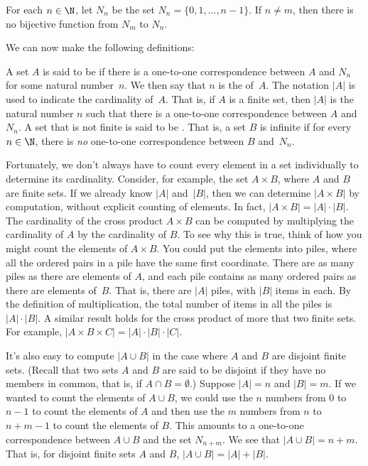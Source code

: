 \begin{theorem}
For each $n\in\N$, let $N_n$ be the set $N_n=\{0,1,\dots,n-1\}$.
If $n\not=m$, then there is no bijective function from $N_m$ to $N_n$.
\end{theorem}


We can now make the following definitions:

\begin{definition}
A set $A$ is said to be  if there is a one-to-one
correspondence between $A$ and $N_n$ for some natural number~$n$.  We then
say that $n$ is the  of~$A$.  The notation $|A|$ is
used to indicate the cardinality of~$A$.  That is, if $A$ is a finite set,
then $|A|$ is the natural number $n$ such that there is a one-to-one
correspondence between $A$ and $N_n$.  A set that is not finite is
said to be .  That is, a set $B$ is infinite
if for every $n\in \N$, there is \emph{no} one-to-one correspondence between
$B$ and~$N_n$.
\end{definition}

Fortunately, we don't always have to count every element in a set individually
to determine its cardinality.  Consider, for example, the set $A\times B$,
where $A$ and $B$ are finite sets.  If we already know $|A|$ and~$|B|$,
then we can determine $|A\times B|$ by computation, without explicit counting of elements.
In fact, $|A\times B|=|A|\cdot |B|$.  The cardinality of the cross product
$A\times B$ can be computed by multiplying the cardinality of $A$ by
the cardinality of $B$.  To see why this is true, think of how you might
count the elements of $A\times B$.  You could put the elements into piles,
where all the ordered pairs in a pile have the same first coordinate.  There
are as many piles as there are elements of $A$, and each pile contains
as many ordered pairs as there are elements of~$B$.  That is, there
are $|A|$ piles, with $|B|$ items in each.  By the definition of multiplication,
the total number of items in all the piles is $|A|\cdot|B|$.
A similar result holds for the cross product of more that two finite sets.
For example, $|A\times B\times C|=|A|\cdot |B|\cdot |C|$.

It's also easy to compute $|A\cup B|$ in the case where $A$ and $B$ are
disjoint finite sets.  (Recall that two sets $A$ and $B$ are said to be
disjoint if they have no members in common, that is, if $A\cap B=\emptyset$.)
Suppose $|A|=n$ and $|B|=m$.  If we wanted to count the elements of $A\cup B$,
we could use the $n$ numbers from 0 to $n-1$ to count the elements of $A$
and then use the $m$ numbers from $n$ to $n+m-1$ to count the elements of
$B$.  This amounts to a one-to-one correspondence between $A\cup B$
and the set $N_{n+m}$.  We see that $|A\cup B|=n+m$.  That is,
for disjoint finite sets $A$ and $B$, $|A\cup B|=|A|+|B|$.

